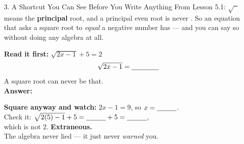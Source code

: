 \documentclass[10pt]{article}
\begin{document}
\begin{notesbox}{3. A Shortcut You Can See Before You Write Anything}
From Lesson 5.1: $\sqrt{\phantom{x}}$ means the \textbf{principal} root, and a principal even root
is never \blank{2.0cm}. So an equation that asks a square root to \emph{equal} a negative number
has \blank{2.6cm} --- and you can say so without doing any algebra at all.
\begin{center}
\begin{minipage}[t]{0.46\linewidth}
\small
\textbf{Read it first:} \; $\sqrt{2x-1}+5=2$
\[ \sqrt{2x-1}=\blank{1.4cm} \]
A square root can never be that. \\[3pt]
\textbf{Answer:} \blank{3.0cm}
\end{minipage}
\hfill
\begin{minipage}[t]{0.50\linewidth}
\small
\textbf{Square anyway and watch:} $2x-1=9$, so $x=\blank{1.0cm}$. \\[3pt]
Check it: $\sqrt{2(5)-1}+5=\blank{1.0cm}+5=\blank{1.0cm}$, \\
which is not $2$. \; \textbf{Extraneous.} \\[3pt]
The algebra never lied --- it just never \emph{warned} you.
\end{minipage}
\end{center}
\end{notesbox}
\end{document}

